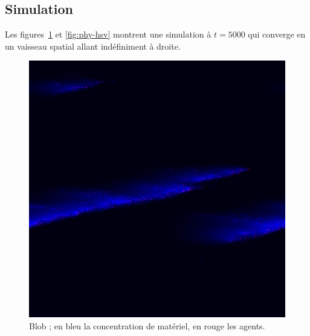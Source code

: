 \documentclass[11pt]{scrartcl}
\begin{document}
        \subsection{Simulation}
            Les figures~\ref{fig:phy-rgb} et \ref{fig:phy-hsv} montrent une simulation à $t = 5000$ qui converge en un vaisseau spatial allant
            indéfiniment à droite.
            
            \begin{figure}[h]
                \centering
                \includegraphics[width=\textwidth]{physarum_rgb}
                \caption{Blob ; en bleu la concentration de matériel, en rouge les agents.}\label{fig:phy-rgb}
            \end{figure}
            
\end{document}
